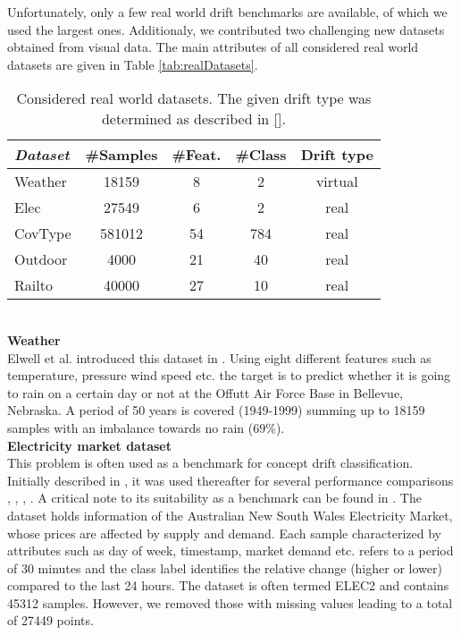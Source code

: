 \documentclass[conference]{IEEEtran}
\begin{document}
Unfortunately, only a few real world drift benchmarks are available, of which we used the largest ones. Additionaly, we contributed two challenging new datasets obtained from visual data.
The main attributes of all considered real world datasets are given in Table \ref{tab:realDatasets}.
\begin{table}
\def\arraystretch{0.9}
\footnotesize
\centering
\caption{Considered real world datasets. The given drift type was determined as described in \ref{}.}
\label{tab:realDatasets}
\begin{tabular}{l|cccc}
\textit{Dataset} & \#Samples&\#Feat.&\#Class&Drift type\\\hline
\rule{0pt}{8pt}
Weather & 18159 & 8 & 2 & virtual\\
Elec & 27549 & 6 & 2 & real\\
CovType & 581012 & 54 & 784 & real\\
Outdoor & 4000 & 21 & 40 & real\\
Railto & 40000 & 27 & 10 & real\\
\end{tabular}
\label{tab:datasets}
\end{table}
\\\textbf{Weather}\\
Elwell et al. introduced this dataset in \cite{5975223}. Using eight different features such as temperature, pressure wind speed etc. the target is to predict 
whether it is going to rain on a certain day or not at the Offutt Air Force Base in Bellevue, Nebraska.
A period of 50 years is covered (1949-1999) summing up to 18159 samples with an imbalance towards no rain ($69\%$).\\
\textbf{Electricity market dataset}\\
This problem is often used as a benchmark for concept drift classification. Initially described in \cite{harries1999splice}, it was used thereafter for several performance comparisons \cite{baena2006early}, \cite{kuncheva2008adaptive}, \cite{Bifet:2013:EDS:2480362.2480516}, \cite{gama2004learning}. 
A critical note to its suitability as a benchmark can be found in \cite{zliobaite2013good}.
The dataset holds information of the Australian New South Wales Electricity Market, whose prices are affected by supply and demand. 
Each sample characterized by attributes such as day of week, timestamp, market demand etc. refers to a period of 30 minutes and the class label identifies the relative change (higher or lower) compared to the last 24 hours.
The dataset is often termed ELEC2 and contains 45312 samples. However, we removed those with missing values leading to a total of 27449 points.\\
\end{document}
